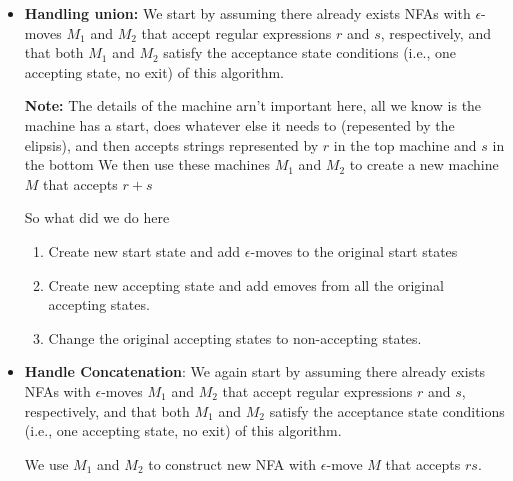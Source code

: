 \documentclass{report}
\begin{document}
\begin{itemize}
\begin{itemize}
    \item \textbf{Handling union:} We start by assuming there already exists NFAs with $\epsilon$-moves $M_{1}$ and $M_{2}$ that accept regular expressions $r$ and $s$, respectively, and that both $M_{1}$ and $M_{2}$ satisfy the acceptance state conditions (i.e., one accepting state, no exit) of this algorithm.
        \bigbreak \noindent 
        \begin{figure}[ht]
            \centering
            \label{fig:crit3}
        \end{figure}
        \bigbreak \noindent 
        \textbf{Note:} The details of the machine arn't important here, all we know is the machine has a start, does whatever else it needs to (repesented by the elipsis), and then accepts strings represented by $r$ in the top machine and $s$ in the bottom
        \bigbreak \noindent 
        We then use these machines $M_{1}$ and $M_{2}$ to create a new machine $M$ that accepts $r+s$
        \bigbreak \noindent 
        \begin{figure}[ht]
            \centering
            \label{fig:crit4}
        \end{figure}
        \bigbreak \noindent 
        So what did we do here
        \begin{enumerate}
            \item Create new start state and add $\epsilon$-moves to the original start states
            \item Create new accepting state and add emoves from all the original accepting states.
            \item Change the original accepting states to non-accepting states.
        \end{enumerate}
    \item \textbf{Handle Concatenation}: We again start by assuming there already exists NFAs with $\epsilon$-moves $M_{1}$ and $M_{2}$ that accept regular expressions $r$ and $s$, respectively, and that both $M_{1}$ and $M_{2}$ satisfy the acceptance state conditions (i.e., one accepting state, no exit) of this algorithm.
        \bigbreak \noindent 
        \begin{figure}[ht]
            \centering
            \label{fig:crit5}
        \end{figure}
        \bigbreak \noindent 
        We use $M_{1}$ and $M_{2}$ to construct new NFA with $\epsilon$-move $M$ that accepts $rs$.
        \bigbreak \noindent 
        \begin{figure}[ht]

\end{figure}
\end{itemize}
\end{itemize}
\end{document}
